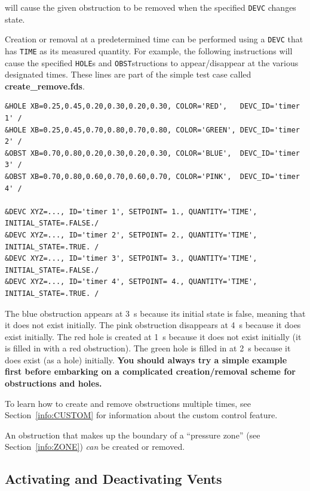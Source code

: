 \documentclass[11pt]{book}
\newcommand{\ct}{\tt\small}
\begin{document}
\noindent
will cause the given obstruction to be removed when the specified {\ct DEVC} changes state.

Creation or removal at a predetermined time can be performed using a {\ct DEVC} that has {\ct TIME} as
its measured quantity. For example, the following instructions will cause the specified {\ct HOLE}s and {\ct OBST}structions to
appear/disappear at the various designated times. These lines are part of the simple test case called {\bf create\_remove.fds}.

\footnotesize
\begin{verbatim}
&HOLE XB=0.25,0.45,0.20,0.30,0.20,0.30, COLOR='RED',   DEVC_ID='timer 1' /
&HOLE XB=0.25,0.45,0.70,0.80,0.70,0.80, COLOR='GREEN', DEVC_ID='timer 2' /
&OBST XB=0.70,0.80,0.20,0.30,0.20,0.30, COLOR='BLUE',  DEVC_ID='timer 3' /
&OBST XB=0.70,0.80,0.60,0.70,0.60,0.70, COLOR='PINK',  DEVC_ID='timer 4' /

&DEVC XYZ=..., ID='timer 1', SETPOINT= 1., QUANTITY='TIME', INITIAL_STATE=.FALSE./
&DEVC XYZ=..., ID='timer 2', SETPOINT= 2., QUANTITY='TIME', INITIAL_STATE=.TRUE. /
&DEVC XYZ=..., ID='timer 3', SETPOINT= 3., QUANTITY='TIME', INITIAL_STATE=.FALSE./
&DEVC XYZ=..., ID='timer 4', SETPOINT= 4., QUANTITY='TIME', INITIAL_STATE=.TRUE. /
\end{verbatim}
\normalsize

\noindent
The blue obstruction appears at 3~s because its initial state is false, meaning that it does not exist initially. The pink
obstruction disappears at 4~s because it does exist initially. The red hole is created at 1~s because it does not exist initially (it is filled in with a
red obstruction). The green hole is filled in at 2~s because it does exist (as a hole) initially. {\bf You should always try a simple example first before
embarking on a complicated creation/removal scheme for obstructions and holes.}

To learn how to create and remove obstructions multiple times, see Section~\ref{info:CUSTOM} for information about the custom control feature.



\begin{warning}
An obstruction that makes up the boundary of a ``pressure zone'' (see Section~\ref{info:ZONE}) {\em can} be created or
removed.
\end{warning}


\subsection{Activating and Deactivating Vents}
\label{info:activate_deactivate}
\end{document}
